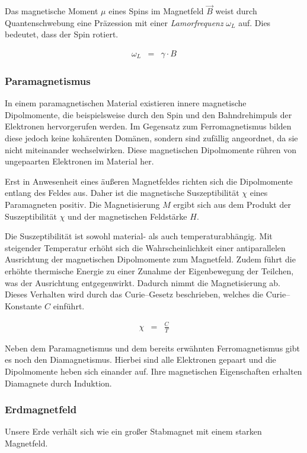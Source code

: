 \documentclass[12pt,a4paper]{scrartcl}
\numberwithin{equation}{section} %
\begin{document}
Das magnetische Moment $\mu$ eines Spins im Magnetfeld $\vec{B}$ weist durch Quantenschwebung eine Präzession mit einer \emph{Lamorfrequenz} $\omega_L$ auf. Dies bedeutet, dass der Spin rotiert.

\begin{eqnarray}
	\omega_L &=& \gamma\cdot B
\end{eqnarray}

\subsubsection{Paramagnetismus}
\label{Paramagnetismus}

In einem paramagnetischen Material existieren innere magnetische Dipolmomente, die beispielsweise durch den Spin und den Bahndrehimpuls der Elektronen hervorgerufen werden. Im Gegensatz zum Ferromagnetismus bilden diese jedoch keine kohärenten Domänen, sondern sind zufällig angeordnet, da sie nicht miteinander wechselwirken. Diese magnetischen Dipolmomente rühren von ungepaarten Elektronen im Material her.

Erst in Anwesenheit eines äußeren Magnetfeldes richten sich die Dipolmomente entlang des Feldes aus. Daher ist die magnetische Suszeptibilität $\chi$ eines Paramagneten positiv. Die Magnetisierung $M$ ergibt sich aus dem Produkt der Suszeptibilität $\chi$ und der magnetischen Feldstärke $H$.

Die Suszeptibilität ist sowohl material- als auch temperaturabhängig. Mit steigender Temperatur erhöht sich die Wahrscheinlichkeit einer antiparallelen Ausrichtung der magnetischen Dipolmomente zum Magnetfeld. Zudem führt die erhöhte thermische Energie zu einer Zunahme der Eigenbewegung der Teilchen, was der Ausrichtung entgegenwirkt. Dadurch nimmt die Magnetisierung ab. Dieses Verhalten wird durch das Curie--Gesetz beschrieben, welches die Curie--Konstante $C$ einführt.

\begin{eqnarray}
	\chi &=& \frac{C}{T}
\end{eqnarray}

\noindent
Neben dem Paramagnetismus und dem bereits erwähnten Ferromagnetismus gibt es noch den Diamagnetismus. Hierbei sind alle Elektronen gepaart und die Dipolmomente heben sich einander auf. Ihre magnetischen Eigenschaften erhalten Diamagnete durch Induktion.

\subsubsection{Erdmagnetfeld}
\label{Erdmagnetfeld}
Unsere Erde verhält sich wie ein großer Stabmagnet mit einem starken Magnetfeld.
\end{document}
